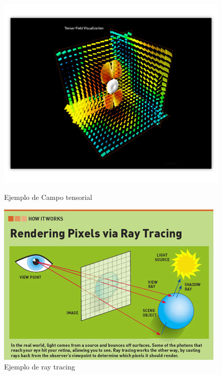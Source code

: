 \documentclass[11pt,letterpaper]{article}     %
\begin{document}
\begin{figure}[hbtp]
\caption{Ejemplo de Campo tensorial}
\includegraphics[scale=0.6]{imagenes/AvizoStandard_Tensor_field_visualization.jpg}
\label{fig:tensorfield}
\end{figure}


\begin{figure}
	\centering
		\includegraphics[scale=0.5]{./imagenes/renderingpixels.jpg}
	\caption{Ejemplo de ray tracing \cite{raytr}}
	\label{fig:ray2}
\end{figure}
\end{document}
